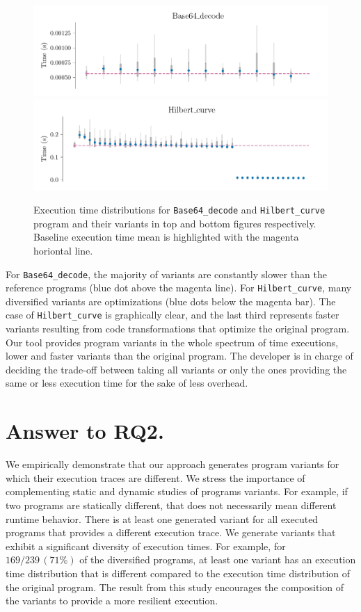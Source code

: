 \begin{figure}[h]
    \centering
    \hspace*{-0.05\linewidth}\includegraphics[width=1.1\linewidth]{plots/base64.pdf}
    \hspace*{-0.05\linewidth}\includegraphics[width=1.1\linewidth]{plots/hilbert_curve.pdf}
    \caption{Execution time distributions for \texttt{Base64\_decode} and \texttt{Hilbert\_curve} program and their variants in top and bottom figures respectively. Baseline execution time mean is highlighted with the magenta horiontal line. }
    \label{rq3:perf}
\end{figure}

For \texttt{Base64\_decode}, the majority of variants are constantly slower than the reference programs (blue dot above the magenta line). For \texttt{Hilbert\_curve}, many diversified variants are optimizations (blue dots below the magenta bar). The case of \texttt{Hilbert\_curve} is graphically clear, and the last third represents faster variants resulting from code transformations that optimize the original program.
Our tool provides program variants in the whole spectrum of time executions, lower and faster variants than the original program. The developer is in charge of deciding the trade-off between taking all variants or only the ones providing the same or less execution time for the sake of less overhead. 

\section{Answer to RQ2.}
We empirically demonstrate that our approach generates program variants for which their execution traces are different. We stress the importance of complementing static and dynamic studies of programs variants. For example, if two programs are statically different, that does not necessarily mean different runtime behavior. There is at least one generated variant for all executed programs that provides a different execution trace. 
We generate variants that exhibit a significant diversity of execution times. For example, for $169/239\,(71\%)$ of the diversified programs, at least one variant has an execution time distribution that is different compared to the execution time distribution of the original program. 
The result from this study encourages the composition of the variants to provide a more resilient execution.